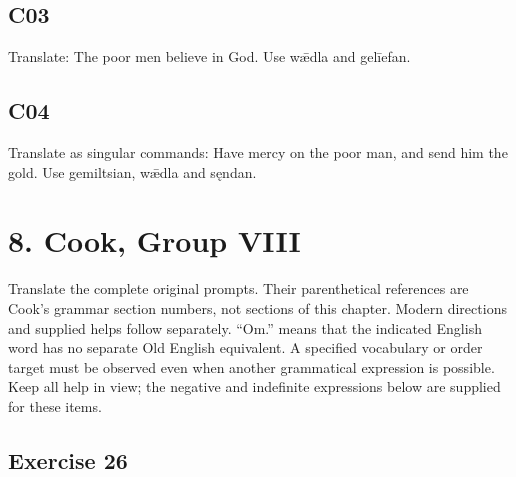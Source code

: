 \par\begin{minipage}{\linewidth}\raggedright
\subsection*{C03}

Translate: The poor men believe in God. Use wǣdla and gelīefan.

\end{minipage}\par\addvspace{4pt}

\par\begin{minipage}{\linewidth}\raggedright
\subsection*{C04}

Translate as singular commands: Have mercy on the poor man, and send him the gold. Use gemiltsian, wǣdla and sęndan.

\end{minipage}\par\addvspace{4pt}

\section*{8. Cook, Group VIII}

Translate the complete original prompts. Their parenthetical references are Cook’s grammar section numbers, not sections of this chapter. Modern directions and supplied helps follow separately. “Om.” means that the indicated English word has no separate Old English equivalent. A specified vocabulary or order target must be observed even when another grammatical expression is possible. Keep all help in view; the negative and indefinite expressions below are supplied for these items.

\subsection*{Exercise 26}

